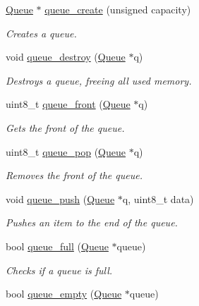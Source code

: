 \begin{DoxyCompactItemize}
\item 
\mbox{\hyperlink{struct_queue}{Queue}} $\ast$ \mbox{\hyperlink{group__queue_ga735dfbf59094f36f47a83d3a139c9b09}{queue\+\_\+create}} (unsigned capacity)
\begin{DoxyCompactList}\small\item\em Creates a queue. \end{DoxyCompactList}\item 
void \mbox{\hyperlink{group__queue_gad21ee75924298937673e2b8d66665466}{queue\+\_\+destroy}} (\mbox{\hyperlink{struct_queue}{Queue}} $\ast$q)
\begin{DoxyCompactList}\small\item\em Destroys a queue, freeing all used memory. \end{DoxyCompactList}\item 
uint8\+\_\+t \mbox{\hyperlink{group__queue_ga6916e93facd123dd3fb655965b440e0e}{queue\+\_\+front}} (\mbox{\hyperlink{struct_queue}{Queue}} $\ast$q)
\begin{DoxyCompactList}\small\item\em Gets the front of the queue. \end{DoxyCompactList}\item 
uint8\+\_\+t \mbox{\hyperlink{group__queue_gaa7c283555566da64b71864f416e0178a}{queue\+\_\+pop}} (\mbox{\hyperlink{struct_queue}{Queue}} $\ast$q)
\begin{DoxyCompactList}\small\item\em Removes the front of the queue. \end{DoxyCompactList}\item 
void \mbox{\hyperlink{group__queue_ga056bdcedf660416247cdb05759766702}{queue\+\_\+push}} (\mbox{\hyperlink{struct_queue}{Queue}} $\ast$q, uint8\+\_\+t data)
\begin{DoxyCompactList}\small\item\em Pushes an item to the end of the queue. \end{DoxyCompactList}\item 
bool \mbox{\hyperlink{group__queue_gaca6621b01a2bae967c3c747bb6d855db}{queue\+\_\+full}} (\mbox{\hyperlink{struct_queue}{Queue}} $\ast$queue)
\begin{DoxyCompactList}\small\item\em Checks if a queue is full. \end{DoxyCompactList}\item 
bool \mbox{\hyperlink{group__queue_gac13fbf345e3ce6a0136afac6cbc039ad}{queue\+\_\+empty}} (\mbox{\hyperlink{struct_queue}{Queue}} $\ast$queue)

\end{DoxyCompactItemize}
